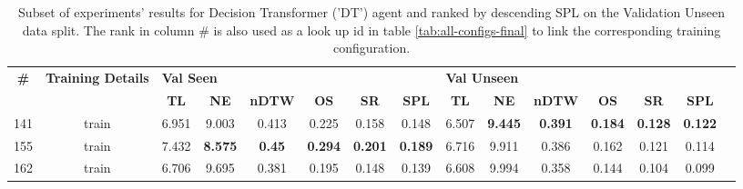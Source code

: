 \begin{table}
\centering
\caption{\label{tab:dt_normalized_visual_features}Subset of experiments' results for Decision Transformer ('DT') agent and ranked by descending SPL on the Validation Unseen data split. The rank in column \# is also used as a look up id in table \ref{tab:all-configs-final} to link the corresponding training configuration.}
\begin{tabular}{@{\hskip3pt}c@{\hskip3pt}c@{\hskip3pt}c@{\hskip3pt}c@{\hskip3pt}c@{\hskip3pt}c@{\hskip3pt}c@{\hskip3pt}c@{\hskip3pt}c@{\hskip3pt}c@{\hskip3pt}c@{\hskip3pt}c@{\hskip3pt}c@{\hskip3pt}c@{\hskip3pt}c}
\toprule
\textbf{\#} & \textbf{Training Details} & \multicolumn{6}{l}{\textbf{Val Seen}} & \multicolumn{6}{l}{\textbf{Val Unseen}} \\
 \textbf{~} &                \textbf{~} &       \textbf{TL} &     \textbf{NE} &  \textbf{nDTW} &     \textbf{OS} &     \textbf{SR} &    \textbf{SPL} &         \textbf{TL} &     \textbf{NE} &   \textbf{nDTW} &     \textbf{OS} &     \textbf{SR} &    \textbf{SPL} \\
\midrule
        141 &                     train &             6.951 &           9.003 &          0.413 &           0.225 &           0.158 &           0.148 &               6.507 &  \textbf{9.445} &  \textbf{0.391} &  \textbf{0.184} &  \textbf{0.128} &  \textbf{0.122} \\
        155 &                     train &             7.432 &  \textbf{8.575} &  \textbf{0.45} &  \textbf{0.294} &  \textbf{0.201} &  \textbf{0.189} &               6.716 &           9.911 &           0.386 &           0.162 &           0.121 &           0.114 \\
        162 &                     train &             6.706 &           9.695 &          0.381 &           0.195 &           0.148 &           0.139 &               6.608 &           9.994 &           0.358 &           0.144 &           0.104 &           0.099 \\
\bottomrule
\end{tabular}
\end{table}
